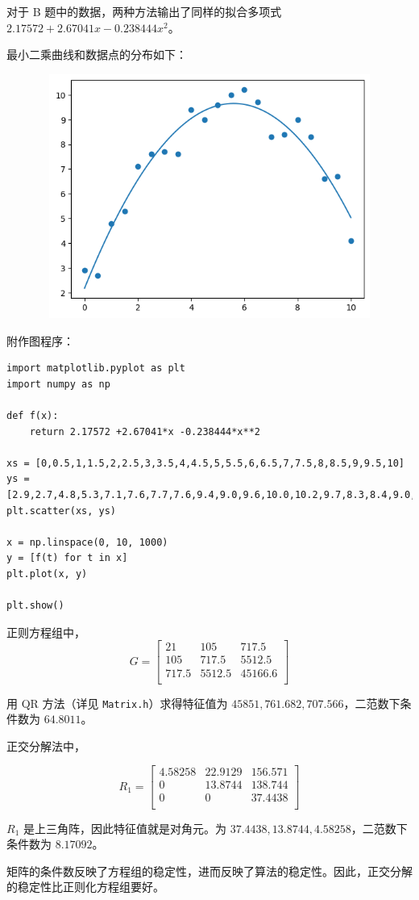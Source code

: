 \documentclass{ctexart}
\begin{document}
对于 B 题中的数据，两种方法输出了同样的拟合多项式 $2.17572 +2.67041x -0.238444x^2$。

最小二乘曲线和数据点的分布如下：

\begin{figure}[h]
    \begin{minipage}{4cm}
	\includegraphics[width = 12cm, height = 8cm]{1.png}
	\label{fig1}
	\end{minipage}
\end{figure}

附作图程序：

\begin{verbatim}
import matplotlib.pyplot as plt
import numpy as np

def f(x):
    return 2.17572 +2.67041*x -0.238444*x**2

xs = [0,0.5,1,1.5,2,2.5,3,3.5,4,4.5,5,5.5,6,6.5,7,7.5,8,8.5,9,9.5,10]
ys = [2.9,2.7,4.8,5.3,7.1,7.6,7.7,7.6,9.4,9.0,9.6,10.0,10.2,9.7,8.3,8.4,9.0,8.3,6.6,6.7,4.1]
plt.scatter(xs, ys)

x = np.linspace(0, 10, 1000)
y = [f(t) for t in x]
plt.plot(x, y)

plt.show()
\end{verbatim}

正则方程组中，
\begin{equation}
G=
\begin{bmatrix}
21 & 105 & 717.5 \\
105 & 717.5 & 5512.5 \\
717.5 & 5512.5 & 45166.6 \\
\end{bmatrix}
\end{equation}

用 QR 方法（详见 \verb|Matrix.h|）求得特征值为 $45851,761.682,707.566$，二范数下条件数为 $64.8011$。

正交分解法中，

\begin{equation}
R_1=
\begin{bmatrix}
4.58258 & 22.9129 & 156.571 \\
0 & 13.8744 & 138.744 \\
0 & 0 & 37.4438 \\
\end{bmatrix}
\end{equation}

$R_1$ 是上三角阵，因此特征值就是对角元。为 $37.4438,13.8744,4.58258$，二范数下条件数为 $8.17092$。

矩阵的条件数反映了方程组的稳定性，进而反映了算法的稳定性。因此，正交分解的稳定性比正则化方程组要好。
\end{document}
